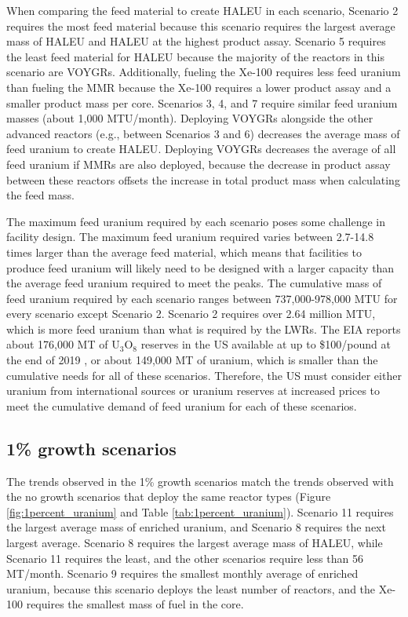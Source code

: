 When comparing the feed material to create \gls{HALEU} in each scenario, 
Scenario 2 requires the most feed material because this scenario 
requires the largest average mass of \gls{HALEU} and \gls{HALEU} at the 
highest product assay. Scenario 5 requires the least feed material for 
\gls{HALEU} because the majority of 
the reactors in this scenario are VOYGRs.
Additionally, fueling the Xe-100 requires less feed uranium than fueling 
the \gls{MMR} because the Xe-100 requires a lower product assay and a 
smaller product mass per core. 
Scenarios 3, 4, and 7 require similar feed uranium masses (about 1,000 
MTU/month). Deploying VOYGRs alongside the other advanced 
reactors (e.g., between Scenarios 3 and 6) decreases the average 
mass of feed uranium to create \gls{HALEU}. Deploying VOYGRs decreases the 
average of all feed uranium if \glspl{MMR} are also deployed, because the 
decrease in product assay between these reactors offsets the increase in 
total product mass when calculating the feed mass. 

The maximum feed uranium required by each scenario poses some 
challenge in facility design. The maximum feed uranium required varies 
between 2.7-14.8 times larger than the average feed material, which means 
that 
facilities to produce feed uranium will likely need to be designed with a 
larger capacity than the average feed uranium required to meet the peaks. 
The cumulative mass of feed uranium required by each scenario ranges between 
737,000-978,000 MTU for every scenario except Scenario 2. 
Scenario 2 requires over 2.64 million MTU, which is more feed uranium 
than what is required by the \glspl{LWR}. The \gls{EIA} reports 
about 176,000 MT of U$_3$O$_8$ reserves in the US available at up to 
\$100/pound at the end of 2019 \cite{us_eia_2020_2021}, or about 
149,000 MT of uranium, which is smaller than the cumulative needs for 
all of these scenarios. Therefore, the US must consider either uranium 
from international sources or uranium reserves at increased 
prices to meet the cumulative demand of feed 
uranium for each of these scenarios.

\subsection{1\% growth scenarios}
The trends observed in the 1\% growth scenarios match the trends 
observed with the no growth scenarios that deploy the same reactor 
types
(Figure \ref{fig:1percent_uranium} and Table \ref{tab:1percent_uranium}). 
Scenario 11 requires the largest average mass of enriched uranium, and Scenario
8 requires the next largest average. Scenario 8 requires the largest 
average mass of \gls{HALEU}, while Scenario 11 requires the least, and the 
other scenarios require less than 56 MT/month. Scenario 9 requires the 
smallest monthly average of enriched uranium, because this scenario 
deploys the least number of reactors, and the Xe-100 requires the smallest 
mass of fuel in the core. 

